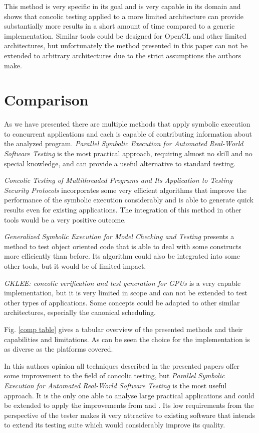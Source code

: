 \documentclass[10pt]{llncs}
\begin{document}
This method is very specific in its goal and is very capable in its domain and shows that concolic testing applied to a more limited architecture can provide substantially more results in a short amount of time compared to a generic implementation. Similar tools could be designed for OpenCL \cite{opencl} and other limited architectures, but unfortunately the method presented in this paper can not be extended to arbitrary architectures due to the strict assumptions the authors make.

\section{Comparison}
\label{comparison}

As we have presented there are multiple methods that apply symbolic execution to concurrent applications and each is capable of contributing information about the analyzed program. \emph{Parallel Symbolic Execution for Automated Real-World Software Testing} \cite{base3} is the most practical approach, requiring almost no skill and no special knowledge, and can provide a useful alternative to standard testing.

\emph{Concolic Testing of Multithreaded Programs and Its Application to Testing Security Protocols} \cite{base4} incorporates some very efficient algorithms that improve the performance of the symbolic execution considerably and is able to generate quick results even for existing applications. The integration of this method in other tools would be a very positive outcome.

\emph{Generalized Symbolic Execution for Model Checking and Testing \cite{base5}} presents a method to test object oriented code that is able to deal with some constructs more efficiently than before. Its algorithm could also be integrated into some other tools, but it would be of limited impact.

\emph{GKLEE: concolic verification and test generation for GPUs \cite{base7}} is a very capable implementation, but it is very limited in scope and can not be extended to test other types of applications. Some concepts could be adapted to other similar architectures, especially the canonical scheduling.

Fig. \ref{comp table} gives a tabular overview of the presented methods and their capabilities and limitations. As can be seen the choice for the implementation is as diverse as the platforms covered.

In this authors opinion all techniques described in the presented papers offer some improvement to the field of concolic testing, but \emph{Parallel Symbolic Execution for Automated Real-World Software Testing \cite{base3}} is the most useful approach. It is the only one able to analyse large practical applications and could be extended to apply the improvements from \cite{base4} and \cite{base5}. Its low requirements from the perspective of the tester makes it very attractive to existing software that intends to extend its testing suite which would considerably improve its quality.
\end{document}
